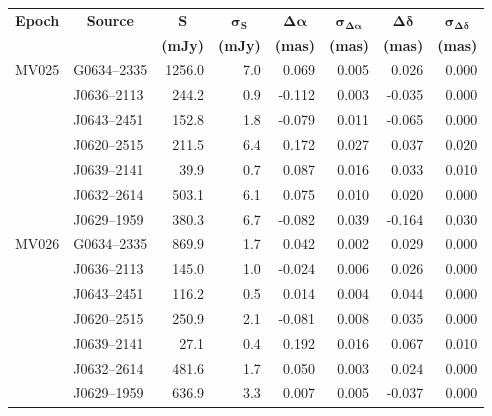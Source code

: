 \begin{table}[h]
	\footnotesize
	\centering
	\onehalfspacing
	\begin{tabular}{llrrrrrr} 
		\toprule
		\multicolumn{1}{c}{\bf Epoch} &
		\multicolumn{1}{c}{\bf Source} & 
		\multicolumn{1}{c}{ $\boldsymbol{S}$} & 
		\multicolumn{1}{c}{ $\boldsymbol{\sigma_S}$} & 
		\multicolumn{1}{c}{ $\boldsymbol{\Delta\alpha}$ } &
		\multicolumn{1}{c}{ $\boldsymbol{\sigma_{\Delta\alpha}}$ } & 
		\multicolumn{1}{c}{ $\boldsymbol{\Delta\delta}$ } &
		\multicolumn{1}{c}{ $\boldsymbol{\sigma_{\Delta\delta}}$ } \\
		\multicolumn{1}{c}{} & 
		\multicolumn{1}{c}{} & 
		\multicolumn{1}{c}{ \textbf{(mJy)} }&
		\multicolumn{1}{c}{ \textbf{(mJy)} }&
		\multicolumn{1}{c}{ \textbf{(mas)} }&
		\multicolumn{1}{c}{ \textbf{(mas)} }&
		\multicolumn{1}{c}{ \textbf{(mas)} }&
		\multicolumn{1}{c}{ \textbf{(mas)} }\\
		\midrule
		MV025 & G0634--2335 & 1256.0  &  7.0   &   0.069  &  0.005  &  0.026  &  0.000 \\
		& J0636--2113 &  244.2  &  0.9   &  -0.112  &  0.003  & -0.035  &  0.000 \\
		& J0643--2451 &  152.8  &  1.8   &  -0.079  &  0.011  & -0.065  &  0.000 \\
		& J0620--2515 &  211.5  &  6.4   &   0.172  &  0.027  &  0.037  &  0.020 \\
		& J0639--2141 &   39.9  &  0.7   &   0.087  &  0.016  &  0.033  &  0.010 \\
		& J0632--2614 &  503.1  &  6.1   &   0.075  &  0.010  &  0.020  &  0.000 \\
		& J0629--1959 &  380.3  &  6.7   &  -0.082  &  0.039  & -0.164  &  0.030 \\ \hline
		
		MV026	& G0634--2335 &  869.9  &  1.7   &   0.042  &  0.002  &  0.029  &  0.000 \\
		& J0636--2113 &  145.0  &  1.0   &  -0.024  &  0.006  &  0.026  &  0.000 \\
		& J0643--2451 &  116.2  &  0.5   &   0.014  &  0.004  &  0.044  &  0.000 \\
		& J0620--2515 &  250.9  &  2.1   &  -0.081  &  0.008  &  0.035  &  0.000 \\
		& J0639--2141 &   27.1  &  0.4   &   0.192  &  0.016  &  0.067  &  0.010 \\
		& J0632--2614 &  481.6  &  1.7   &   0.050  &  0.003  &  0.024  &  0.000 \\
		& J0629--1959 &  636.9  &  3.3   &   0.007  &  0.005  & -0.037  &  0.000 \\ \hline
		

\end{tabular}
\end{table}

